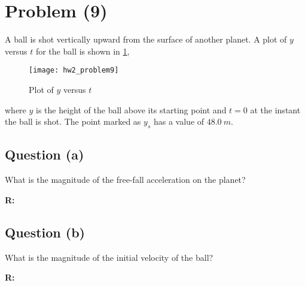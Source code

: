 \section{Problem (9)}
	A ball is shot vertically upward from the surface of another planet. A plot of $y$ versus $t$ for the ball is shown in \cref{fig:hw2_problem9},

	\begin{figure}[H]
		\begin{center}
			\texttt{[image: hw2\_problem9]}
			\caption{Plot of $y$ versus $t$}
			\label{fig:hw2_problem9}
		\end{center}
	\end{figure}

	where $y$ is the height of the ball above its starting point and $t = 0$ at the instant the ball is shot. The point marked as $y_{s}$ has a value of $48.0 \ m$.

	\subsection{Question (a)}
		What is the magnitude of the free-fall acceleration on the planet?

		\textbf{R:} \newline

	\subsection{Question (b)}
		What is the magnitude of the initial velocity of the ball?

		\textbf{R:} \newline
